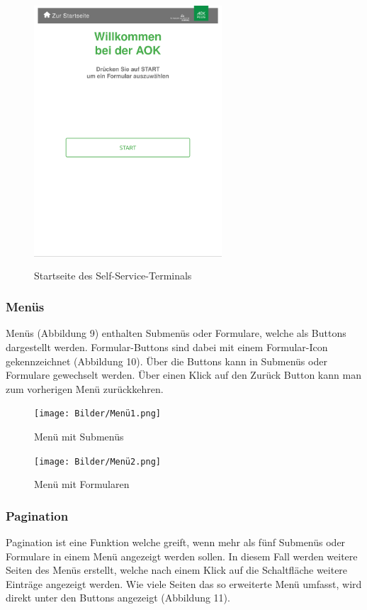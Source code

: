 \begin{figure}[htp]
    \centering
    \includegraphics[width=7cm , height=10cm]{Bilder/Startseite.png}
    \caption[Startseite des Self-Service-Terminals]{Startseite des Self-Service-Terminals}
    \label{fig:SSTStart}
\end{figure}

\newpage

\subsubsection{Menüs}Menüs (Abbildung 9) enthalten Submenüs oder Formulare, welche als Buttons dargestellt werden. Formular-Buttons sind dabei mit einem Formular-Icon gekennzeichnet (Abbildung 10). Über die Buttons kann in Submenüs oder Formulare gewechselt werden. Über einen Klick auf den \glqq Zurück\grqq{} Button kann man zum vorherigen Menü zurückkehren.

\begin{figure}[htp]
    \centering
    \texttt{[image: Bilder/Menü1.png]}
    \caption[Startseite des Self-Service-Terminals]{Menü mit Submenüs}
    \label{fig:SSTMenüSubmenü}
\end{figure}

\begin{figure}[htp]
    \centering
    \texttt{[image: Bilder/Menü2.png]}
    \caption[Startseite des Self-Service-Terminals]{Menü mit Formularen}
    \label{fig:SSTMenüFormulare}
\end{figure}

\newpage

\subsubsection{Pagination} Pagination ist eine Funktion welche greift, wenn mehr als fünf Submenüs oder Formulare in einem Menü angezeigt werden sollen. In diesem Fall werden weitere Seiten des Menüs erstellt, welche nach einem Klick auf die Schaltfläche \glqq weitere Einträge\grqq{} angezeigt werden. Wie viele Seiten das so erweiterte Menü umfasst, wird direkt unter den Buttons angezeigt (Abbildung 11).

